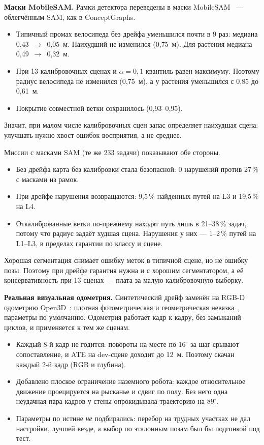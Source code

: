 \textbf{Маски MobileSAM.} Рамки детектора переведены в маски MobileSAM~\cite{mobilesam} --- облегчённым SAM, как в ConceptGraphs.
\begin{itemize}[nosep]
  \item Типичный промах велосипеда без дрейфа уменьшился почти в 9 раз: медиана 0{,}43~$\to$~0{,}05~м. Наихудший не изменился (0{,}75~м). Для растения медиана 0{,}49~$\to$~0{,}32~м.
  \item При 13 калибровочных сценах и $\alpha = 0{,}1$ квантиль равен максимуму. Поэтому радиус велосипеда не изменился (0{,}75~м), а у растения уменьшился с 0{,}85 до 0{,}61~м.
  \item Покрытие совместной ветки сохранилось (0{,}93--0{,}95).
\end{itemize}
Значит, при малом числе калибровочных сцен запас определяет наихудшая сцена: улучшать нужно хвост ошибок восприятия, а не среднее.

Миссии с масками SAM (те же 233 задачи) показывают обе стороны.
\begin{itemize}[nosep]
  \item Без дрейфа карта без калибровки стала безопасной: 0 нарушений против 27\,\% с масками из рамок.
  \item При дрейфе нарушения возвращаются: 9{,}5\,\% найденных путей на L3 и 19{,}5\,\% на L4.
  \item Откалиброванные ветки по-прежнему находят путь лишь в 21--38\,\% задач, потому что радиус задаёт худшая сцена. Нарушения у них --- 1--2\,\% путей на L1--L3, в пределах гарантии по классу и сцене.
\end{itemize}
Хорошая сегментация снимает ошибку меток в типичной сцене, но не ошибку позы. Поэтому при дрейфе гарантия нужна и с хорошим сегментатором, а её консервативность при 13 сценах --- плата за малую калибровочную выборку.

\textbf{Реальная визуальная одометрия.} Синтетический дрейф заменён на RGB-D одометрию Open3D~\cite{open3d}: плотная фотометрическая и геометрическая невязка~\cite{steinbrucker}, параметры по умолчанию. Одометрия работает кадр к кадру, без замыканий циклов, и применяется к тем же сценам.
\begin{itemize}[nosep]
  \item Каждый 8-й кадр не годится: повороты на месте по $16^\circ$ за шаг срывают сопоставление, и ATE на dev-сцене доходит до 12~м. Поэтому скачан каждый 2-й кадр (RGB и глубина).
  \item Добавлено плоское ограничение наземного робота: каждое относительное движение проецируется на рысканье и сдвиг по полу. Без него одна неудачная пара кадров у стены опрокидывала траекторию на $89^\circ$.
  \item Параметры по истине \emph{не} подбирались: перебор на трудных участках не дал настройки, лучшей везде, а выбор по эталонным позам был бы подгонкой под тест.
\end{itemize}

